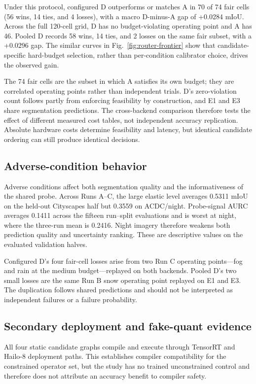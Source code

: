 \documentclass[a4paper,review,12pt]{elsarticle}
\newcommand{\miou}{mIoU}
\begin{document}
Under this protocol, configured D outperforms or matches A in 70 of 74 fair cells (56 wins, 14 ties, and 4 losses), with a macro D-minus-A gap of +0.0284 \miou{}. Across the full 120-cell grid, D has no budget-violating operating point and A has 46. Pooled D records 58 wins, 14 ties, and 2 losses on the same fair subset, with a +0.0296 gap. The similar curves in Fig.~\ref{fig:router-frontier} show that candidate-specific hard-budget selection, rather than per-condition calibrator choice, drives the observed gain.

The 74 fair cells are the subset in which A satisfies its own budget; they are correlated operating points rather than independent trials. D's zero-violation count follows partly from enforcing feasibility by construction, and E1 and E3 share segmentation predictions. The cross-backend comparison therefore tests the effect of different measured cost tables, not independent accuracy replication. Absolute hardware costs determine feasibility and latency, but identical candidate ordering can still produce identical decisions.

\subsection{Adverse-condition behavior}

Adverse conditions affect both segmentation quality and the informativeness of the shared probe. Across Runs A--C, the large elastic level averages 0.5311 \miou{} on the held-out Cityscapes half but 0.3559 on ACDC/night. Probe-signal AURC averages 0.1411 across the fifteen run--split evaluations and is worst at night, where the three-run mean is 0.2416. Night imagery therefore weakens both prediction quality and uncertainty ranking. These are descriptive values on the evaluated validation halves.

Configured D's four fair-cell losses arise from two Run C operating points---fog and rain at the medium budget---replayed on both backends. Pooled D's two small losses are the same Run B snow operating point replayed on E1 and E3. The duplication follows shared predictions and should not be interpreted as independent failures or a failure probability.

\subsection{Secondary deployment and fake-quant evidence}
\label{sec:qatresults}

All four static candidate graphs compile and execute through TensorRT and Hailo-8 deployment paths. This establishes compiler compatibility for the constrained operator set, but the study has no trained unconstrained control and therefore does not attribute an accuracy benefit to compiler safety.
\end{document}

